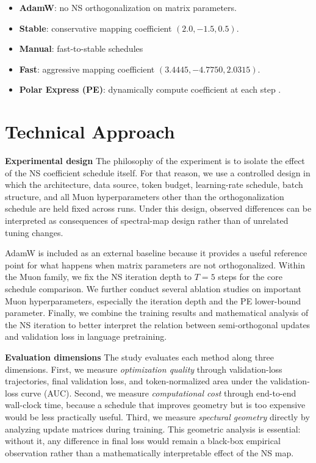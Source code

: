 \documentclass[10pt]{article}
\begin{document}
\begin{itemize}
    \item \textbf{AdamW}: no NS orthogonalization on matrix parameters.
    \item \textbf{Stable}: conservative mapping coefficient $(2.0,-1.5,0.5)$.
    \item \textbf{Manual}: fast-to-stable schedules
    \item \textbf{Fast}: aggressive mapping coefficient $(3.4445,-4.7750,2.0315)$.
    \item \textbf{Polar Express (PE)}: dynamically compute coefficient at each step \citep{amsel2025polar}.
\end{itemize}

\section{Technical Approach}
\textbf{Experimental design}
The philosophy of the experiment is to isolate the effect of the NS coefficient schedule itself. For that reason, we use a controlled design in which the architecture, data source, token budget, learning-rate schedule, batch structure, and all Muon hyperparameters other than the orthogonalization schedule are held fixed across runs. Under this design, observed differences can be interpreted as consequences of spectral-map design rather than of unrelated tuning changes.

AdamW is included as an external baseline because it provides a useful reference point for what happens when matrix parameters are not orthogonalized. Within the Muon family, we fix the NS iteration depth to $T=5$ steps for the core schedule comparison. We further conduct several ablation studies on important Muon hyperparameters, especially the iteration depth and the PE lower-bound parameter. Finally, we combine the training results and mathematical analysis of the NS iteration to better interpret the relation between semi-orthogonal updates and validation loss in language pretraining.

\textbf{Evaluation dimensions}
The study evaluates each method along three dimensions. First, we measure \emph{optimization quality} through validation-loss trajectories, final validation loss, and token-normalized area under the validation-loss curve (AUC). Second, we measure \emph{computational cost} through end-to-end wall-clock time, because a schedule that improves geometry but is too expensive would be less practically useful. Third, we measure \emph{spectural geometry} directly by analyzing update matrices during training. This geometric analysis is essential: without it, any difference in final loss would remain a black-box empirical observation rather than a mathematically interpretable effect of the NS map.
\end{document}
